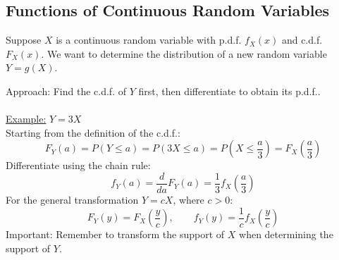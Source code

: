 ﻿\documentclass[12pt]{article}
\begin{document}
\subsection*{Functions of Continuous Random Variables}
Suppose \(X\) is a continuous random variable with p.d.f. \(f_X(x)\) and c.d.f. \(F_X(x)\). We want to determine the distribution of a new random variable \(Y=g(X)\).

Approach: Find the c.d.f. of \(Y\) first, then differentiate to obtain its p.d.f..\\\\
\underline{Example:} \(Y=3X\)\\
Starting from the definition of the c.d.f.:
\[
F_Y(a)=P(Y\leq a)=P(3X\leq a)=P\left(X\leq\frac a3\right)=F_X\left(\frac a3\right)
\]
Differentiate using the chain rule:
\[
\boxed{f_Y(a)=\frac{d}{da}F_Y(a)=\frac13f_X\left(\frac a3\right)}
\]
For the general transformation \(Y=cX\), where \(c>0\):
\[
\boxed{F_Y(y)=F_X\left(\frac yc\right),\qquad f_Y(y)=\frac1c f_X\left(\frac yc\right)}
\]
Important: Remember to transform the support of \(X\) when determining the support of \(Y\).
\end{document}
